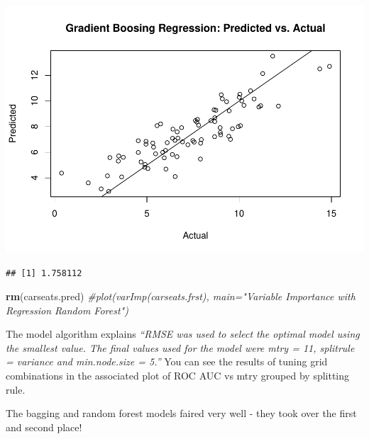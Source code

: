 \documentclass[
]{book}
\newenvironment{Shaded}{\begin{snugshade}}{\end{snugshade}}
\newcommand{\CommentTok}[1]{\textcolor[rgb]{0.56,0.35,0.01}{\textit{#1}}}
\newcommand{\DataTypeTok}[1]{\textcolor[rgb]{0.13,0.29,0.53}{#1}}
\newcommand{\KeywordTok}[1]{\textcolor[rgb]{0.13,0.29,0.53}{\textbf{#1}}}
\newcommand{\NormalTok}[1]{#1}
\newcommand{\OperatorTok}[1]{\textcolor[rgb]{0.81,0.36,0.00}{\textbf{#1}}}
\newcommand{\StringTok}[1]{\textcolor[rgb]{0.31,0.60,0.02}{#1}}
\begin{document}
\includegraphics{data-sci_files/figure-latex/unnamed-chunk-87-2.pdf}

\begin{Shaded}
\end{Shaded}

\begin{verbatim}
## [1] 1.758112
\end{verbatim}

\begin{Shaded}
\begin{Highlighting}[]
\KeywordTok{rm}\NormalTok{(carseats.pred)}
\CommentTok{#plot(varImp(carseats.frst), main="Variable Importance with Regression Random Forest")}
\end{Highlighting}
\end{Shaded}

The model algorithm explains \emph{``RMSE was used to select the optimal model using the smallest value. The final values used for the model were mtry = 11, splitrule = variance and min.node.size = 5.''} You can see the results of tuning grid combinations in the associated plot of ROC AUC vs mtry grouped by splitting rule.

The bagging and random forest models faired very well - they took over the first and second place!
\end{document}
